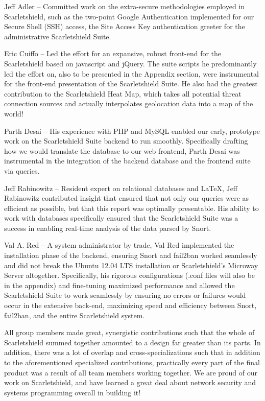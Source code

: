 \documentclass[12pt,letterpaper,titlepage]{report}
\begin{document}
{Jeff Adler -- Committed work on the extra-secure methodologies employed in
Scarletshield, such as the two-point Google Authentication implemented for our
Secure Shell (SSH) access, the Site Access Key authentication greeter for the
administrative Scarletshield Suite.

Eric Cuiffo -- Led the effort for an expansive, robust front-end for the
Scarletshield based on javascript and jQuery. The suite scripts he predominantly
led the effort on, also to be presented in the Appendix section, were
instrumental for the front-end presentation of the Scarletshield Suite.  He also
had the greatest contribution to the Scarletshield Heat Map, which takes all
potential threat connection sources and actually interpolates geolocation data
into a map of the world!

Parth Desai -- His experience with PHP and MySQL enabled our early, prototype
work on the Scarletshield Suite backend to run smoothly.  Specifically drafting
how we would translate the database to our web frontend, Parth Desai was
instrumental in the integration of the backend database and the frontend suite
via queries.

Jeff Rabinowitz -- Resident expert on relational databases and LaTeX, Jeff
Rabinowitz contributed insight that ensured that not only our queries were as
efficient as possible, but that this report was optimally presentable.  His
ability to work with databases specifically ensured that the Scarletshield Suite
was a success in enabling real-time analysis of the data parsed by Snort.

Val A. Red -- A system administrator by trade, Val Red implemented the
installation phase of the backend, ensuring Snort and fail2ban worked seamlessly
and did not break the Ubuntu 12.04 LTS installation or Scarletshield’s Microway
Server altogether.  Specifically, his rigorous configurations (.conf files will
also be in the appendix) and fine-tuning maximized performance and allowed the
Scarletshield Suite to work seamlessly by ensuring no errors or failures would
occur in the extensive back-end, maximizing speed and efficiency between Snort,
fail2ban, and the entire Scarletshield system.

All group members made great, synergistic contributions such that the whole of
Scarletshield summed together amounted to a design far greater than its parts.
In addition, there was a lot of overlap and cross-specializations such that in
addition to the aforementioned specialized contributions, practically every part
of the final product was a result of all team members working together. We are
proud of our work on Scarletshield, and have learned a great deal about network
security and systems programming overall in building it!



}
\printbibliography
\end{document}
